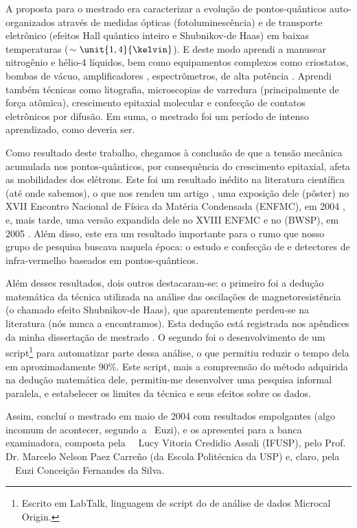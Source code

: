 A proposta para o mestrado era caracterizar a evolução de pontos-quânticos auto-organizados através de medidas ópticas (fotoluminescência) e de transporte eletrônico (efeitos Hall quântico inteiro e Shubnikov-de Haas) em baixas temperaturas ($\sim\unit{1,4}{\kelvin}$). E deste modo aprendi a manusear nitrogênio e hélio-4 líquidos, bem como equipamentos complexos como criostatos, bombas de vácuo, amplificadores , espectrômetros,  de alta potência \etc. Aprendi também técnicas como litografia, microscopias de varredura (principalmente de força atômica), crescimento epitaxial molecular e confecção de contatos eletrônicos por difusão. Em suma, o mestrado foi um período de intenso aprendizado, como deveria ser.

Como resultado deste trabalho, chegamos à conclusão de que a tensão mecânica acumulada nos pontos-quânticos, por consequência do crescimento epitaxial, afeta as mobilidades dos elétrons. Este foi um resultado inédito na literatura científica (até onde sabemos), o que nos rendeu um artigo \cite{pagnossin-2005-1}, uma exposição dele (pôster) no XVII Encontro Nacional de Física da Matéria Condensada (ENFMC), em 2004 \cite{pagnossin-2004-2}, e, mais tarde, uma versão expandida dele no XVIII ENFMC e no  (BWSP), em 2005 \cite{pagnossin-2005-2, pagnossin-2005-3}. Além disso, este era um resultado importante para o rumo que nosso grupo de pesquisa buscava naquela época: o estudo e confecção de  e detectores de infra-vermelho baseados em pontos-quânticos.

Além desses resultados, dois outros destacaram-se: o primeiro foi a dedução matemática da técnica utilizada na análise das oscilações de magnetoresistência (o chamado efeito Shubnikov-de Haas), que aparentemente perdeu-se na literatura (nós nunca a encontramos). Esta dedução está registrada nos apêndices da minha dissertação de mestrado \cite{pagnossin-2004-1}. O segundo foi o desenvolvimento de um script\footnote{Escrito em LabTalk, linguagem de script do  de análise de dados Microcal Origin.} para automatizar parte dessa análise, o que permitiu reduzir o tempo dela em aproximadamente 90\%. Este script, mais a compreensão do método adquirida na dedução matemática dele, permitiu-me desenvolver uma pesquisa informal paralela, e estabelecer os limites da técnica e seus efeitos sobre os dados.

Assim, concluí o mestrado em maio de 2004 com resultados empolgantes (algo incomum de acontecer, segundo a \profa\ Euzi), e os apresentei para a banca examinadora, composta pela \profa\ \dra\ Lucy Vitoria Credidio Assali (IFUSP), pelo Prof. Dr. Marcelo Nelson Paez Carreño (da Escola Politécnica da USP) e, claro, pela \profa\ \dra\ Euzi Conceição Fernandes da Silva.

